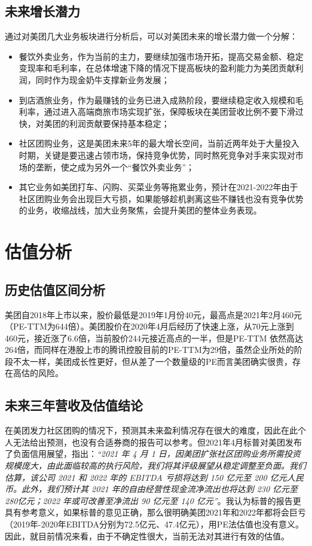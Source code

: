 \documentclass[UTF8,a4paper,12pt,lang=cn,fontset = windows]{elegantpaper} %
\begin{document}
\subsection{未来增长潜力}
通过对美团几大业务板块进行分析后，可以对美团未来的增长潜力做一个分解：
\begin{itemize}
  \item 餐饮外卖业务，作为当前的主力，要继续加强市场开拓，提高交易金额、稳定变现率和毛利率，在总体增速下降的情况下提高板块的盈利能力为美团贡献利润，同时作为现金奶牛支撑新业务发展；
  \item 到店酒旅业务，作为最赚钱的业务已进入成熟阶段，要继续稳定收入规模和毛利率，通过进入高端商旅市场实现扩张，保障板块在美团营收比例不要下滑过快，对美团的利润贡献要保持基本稳定；
  \item 社区团购业务，这是美团未来5年的最大增长空间，当前近两年处于大量投入时期，关键是要迅速占领市场，保持竞争优势，同时熬死竞争对手来实现对市场的垄断，使之成为另外一个“餐饮外卖业务”；
  \item 其它业务如美团打车、闪购、买菜业务等拖累业务，预计在2021-2022年由于社区团购业务会出现巨大亏损，如果能够趁机剥离这些不赚钱也没有竞争优势的业务，收缩战线，加大业务聚焦，会提升美团的整体业务表现。
  \end{itemize}
\section{估值分析}
\subsection{历史估值区间分析}
美团自2018年上市以来，股价最低是2019年1月份40元，最高点是2021年2月460元（PE-TTM为644倍）。美团股价在2020年4月后经历了快速上涨，从70元上涨到460元，接近涨了6.6倍，当前股价244元接近高点的一半，但是PE-TTM 依然高达264倍，而同样在港股上市的腾讯控股目前的PE-TTM为29倍，虽然企业所处的阶段不太一样，美团成长性更好，但从差了一个数量级的PE而言美团确实很贵，存在高估的风险。

\subsection{未来三年营收及估值结论}
在美团发力社区团购的情况下，预测其未来盈利情况存在很大的难度，因此在此个人无法给出预测，也没有合适券商的报告可以参考。但2021年4月标普对美团发布了负面信用展望，指出：\textit{“2021 年 4 月 1 日，因美团扩张社区团购业务所需投资规模庞大，由此面临较高的执行风险，我们将其评级展望从稳定调整至负面。我们估算，该公司 2021 和 2022 年的 EBITDA 亏损将达到 150 亿元至 200 亿元人民币。此外，我们预计其 2021 年的自由经营性现金流净流出也将达到 230 亿元至 280亿元；2022 年或可改善至净流出 90 亿元至 140 亿元”}。我认为标普的报告更具有参考意义，如果标普的意见正确，那么很明确美团2021年和2022年都将会巨亏（2019年-2020年EBITDA分别为72.5亿元、47.4亿元），用PE法估值也没有意义。因此，就目前情况来看，由于不确定性很大，当前无法对其进行有效的估值。
\end{document}
